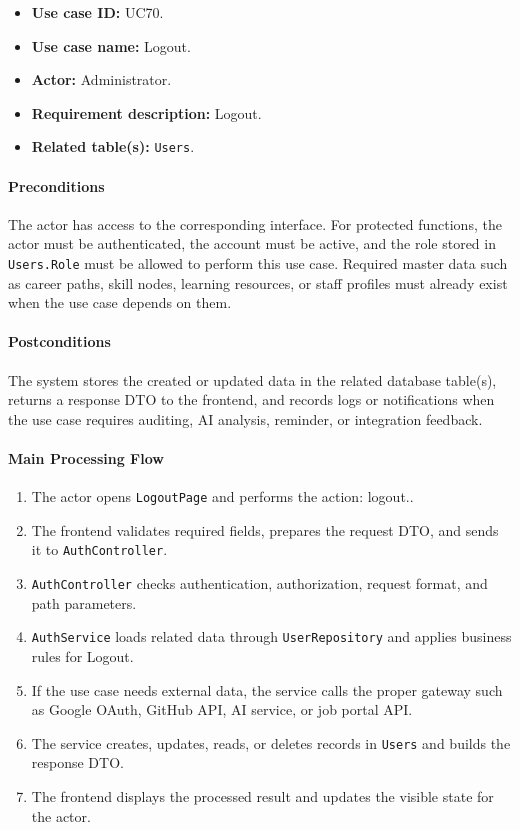 \begin{itemize}
    \item \textbf{Use case ID:} UC70.
    \item \textbf{Use case name:} Logout.
    \item \textbf{Actor:} Administrator.
    \item \textbf{Requirement description:} Logout.
    \item \textbf{Related table(s):} \texttt{Users}.
\end{itemize}

\paragraph{Preconditions}

The actor has access to the corresponding interface. For protected functions, the actor must be authenticated, the account must be active, and the role stored in \texttt{Users.Role} must be allowed to perform this use case. Required master data such as career paths, skill nodes, learning resources, or staff profiles must already exist when the use case depends on them.

\paragraph{Postconditions}

The system stores the created or updated data in the related database table(s), returns a response DTO to the frontend, and records logs or notifications when the use case requires auditing, AI analysis, reminder, or integration feedback.

\paragraph{Main Processing Flow}

\begin{enumerate}
    \item The actor opens \texttt{LogoutPage} and performs the action: logout..
    \item The frontend validates required fields, prepares the request DTO, and sends it to \texttt{AuthController}.
    \item \texttt{AuthController} checks authentication, authorization, request format, and path parameters.
    \item \texttt{AuthService} loads related data through \texttt{UserRepository} and applies business rules for Logout.
    \item If the use case needs external data, the service calls the proper gateway such as Google OAuth, GitHub API, AI service, or job portal API.
    \item The service creates, updates, reads, or deletes records in \texttt{Users} and builds the response DTO.
    \item The frontend displays the processed result and updates the visible state for the actor.
\end{enumerate}

